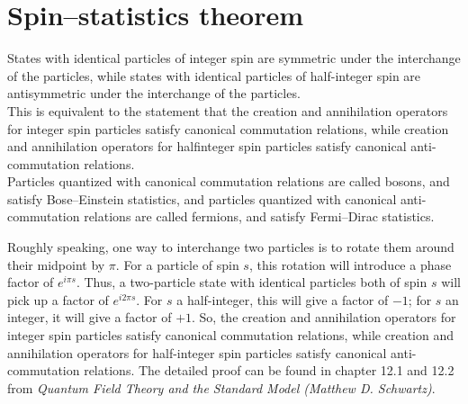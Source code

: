 \section{Spin–statistics theorem}
\begin{newthem}
States with identical particles of integer spin are symmetric under the interchange of the particles, while states with identical particles of half-integer spin are antisymmetric under the interchange of the particles. \\
This is equivalent to the statement that the creation and annihilation operators for integer spin particles satisfy canonical commutation relations, while creation and annihilation operators for halfinteger spin particles satisfy canonical anti-commutation relations. \\
Particles quantized with canonical commutation relations are called bosons, and satisfy Bose–Einstein statistics, and particles quantized with canonical anti-commutation relations are called fermions, and satisfy Fermi–Dirac statistics.
\end{newthem}

\noindent
Roughly speaking,  one way to interchange two particles is to rotate them around their midpoint by $\pi$. For a particle of spin $s$, this rotation will introduce a phase factor of $e^{i\pi s}$. Thus, a two-particle state with identical particles both of spin $s$ will pick up a factor of $e^{i2\pi s}$. For $s$ a half-integer, this will give a factor of $-1$; for $s$ an integer, it will give a factor of $+1$. So, the creation and annihilation operators for integer spin particles satisfy canonical commutation relations, while creation and annihilation operators for half-integer spin particles satisfy canonical anti-commutation relations. The detailed proof can be found in chapter 12.1 and 12.2 from \emph{Quantum Field Theory and the Standard Model (Matthew D. Schwartz)}.

